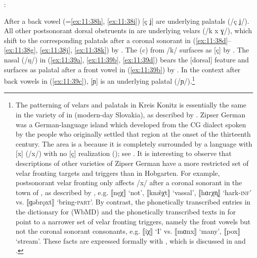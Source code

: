\ea%
\label{ex:11:40}:\smallskip\\
\z 

After a back vowel (=\ref{ex:11:38h}, \ref{ex:11:38i}) [ç ʝ] are underlying palatals (/ç ʝ/). All other postsonorant dorsal obstruents in  are underlying velars (/k x ɣ/), which shift to the corresponding palatals after a coronal sonorant in (\ref{ex:11:38d}--\ref{ex:11:38g}, \ref{ex:11:38j}, \ref{ex:11:38k}) by . The  ({\textbar}c{\textbar}) from /k/ surfaces as [ç] by . The nasal (/ŋ/) in (\ref{ex:11:39a}, \ref{ex:11:39b}, \ref{ex:11:39d}) bears the [dorsal] feature and surfaces as palatal after a front vowel in (\ref{ex:11:39b}) by . In the context after back vowels in (\ref{ex:11:39c}), [ɲ] is an underlying palatal (/ɲ/).\footnote{The patterning of velars and palatals in Kreis Konitz is essentially the same in the variety of  in  (modern-day Slovakia), as described by \citet{Gréb1921}. Zipser German was a German-language island which developed from the CG dialect spoken by the people who originally settled that region at the onset of the thirteenth century. The area is a  because it is completely surrounded by a language with [x] (/x/) with no [ç] realization (); see \citet{HanulíkováandHamann2010}. It is interesting to observe that descriptions of other varieties of Zipser German have a more restricted set of velar fronting targets and triggers than in Hobgarten. For example,  postsonorant velar fronting only affects /x/ after a coronal sonorant in the town of , as described by \citet{Lumtzer1894, Lumtzer1896}, e.g. ⟦nęχ⟧ ‘not’, ⟦knæ̂χt⟧ ‘vassal’, ⟦hɑrχn̥⟧ ‘hark-\textsc{inf}’ vs. ⟦ɡəbrǫxt⟧ ‘bring-\textsc{part}’. By contrast, the phonetically transcribed entries in the dictionary for  (WbMD) and the phonetically transcribed texts in  \citet{Kövi1911} for  point to a narrower set of velar fronting triggers, namely the front vowels but not the coronal sonorant consonants, e.g. ⟦iχ⟧ ‘I’ vs. ⟦mɑnx⟧ ‘many’, ⟦pox⟧ ‘stream’. These facts are expressed formally with , which is discussed in  and .}

